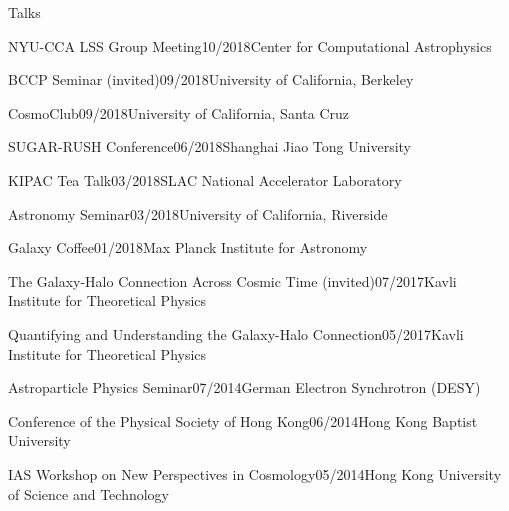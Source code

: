 \documentclass[11pt]{resume} %
\begin{document}
\begin{rSection}{Talks}
  \begin{adjustwidth}{0.5cm}{}

    \begin{rSubsection}{NYU-CCA LSS Group Meeting}{10/2018}{Center for Computational Astrophysics}{}\end{rSubsection}

    \begin{rSubsection}{BCCP Seminar (invited)}{09/2018}{University of California, Berkeley}{}\end{rSubsection}

    \begin{rSubsection}{CosmoClub}{09/2018}{University of California, Santa Cruz}{}\end{rSubsection}

    \begin{rSubsection}{SUGAR-RUSH Conference}{06/2018}{Shanghai Jiao Tong University}{}\end{rSubsection}

    \begin{rSubsection}{KIPAC Tea Talk}{03/2018}{SLAC National Accelerator Laboratory}{}\end{rSubsection}

    \begin{rSubsection}{Astronomy Seminar}{03/2018}{University of California, Riverside}{}\end{rSubsection}

    \begin{rSubsection}{Galaxy Coffee}{01/2018}{Max Planck Institute for Astronomy}{}\end{rSubsection}

    \begin{rSubsection}{The Galaxy-Halo Connection Across Cosmic Time (invited)}{07/2017}{Kavli Institute for Theoretical Physics}{}\end{rSubsection}

    \begin{rSubsection}{Quantifying and Understanding the Galaxy-Halo Connection}{05/2017}{Kavli Institute for Theoretical Physics}{}\end{rSubsection}

    \begin{rSubsection}{Astroparticle Physics Seminar}{07/2014}{German Electron Synchrotron (DESY)}{}\end{rSubsection}

    \begin{rSubsection}{Conference of the Physical Society of Hong Kong}{06/2014}{Hong Kong Baptist University}{}\end{rSubsection}

    \begin{rSubsection}{IAS Workshop on New Perspectives in Cosmology}{05/2014}{Hong Kong University of Science and Technology}{}\end{rSubsection}
  \end{adjustwidth}
\end{rSection}
\end{document}
